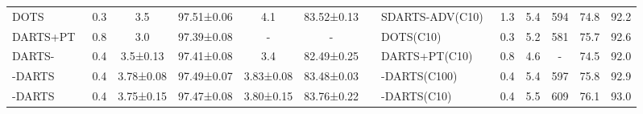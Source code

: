 \documentclass[10pt,twocolumn,letterpaper]{article}
\begin{document}
\begin{table*}[t]
\begin{center}
{\begin{tabular}{lcccccllccccc}
DOTS~\cite{dots}                    & 0.3                                                                   & 3.5          & 97.51±0.06    & 4.1           & 83.52±0.13    &  & SDARTS-ADV(C10)~\cite{sdarts}                     & 1.3                                                                   & 5.4                                                                   & 594                                                                  & 74.8                                                                 & 92.2                                                                 \\
DARTS+PT~\cite{darts+pt}                & 0.8                                                                   & 3.0          & 97.39±0.08    & -             & -             &  & DOTS(C10)~\cite{dots}                           & 0.3                                                                   & 5.2                                                                   & 581                                                                  & 75.7                                                                 & 92.6                                                                 \\
DARTS-~\cite{darts-}                  & 0.4                                                                   & 3.5±0.13     & 97.41±0.08    & 3.4           & 82.49±0.25    &  & DARTS+PT(C10)~\cite{darts+pt}                       & 0.8                                                                   & 4.6                                                                   & -                                                                    & 74.5                                                                 & 92.0                                                                 \\
-DARTS         & 0.4                                                                   & 3.78±0.08    & 97.49±0.07    & 3.83±0.08     & 83.48±0.03    &  & -DARTS(C100)                     & 0.4                                                  & 5.4                                                  & 597                                                 & 75.8                                                 & 92.9                                                 \\
-DARTS        & 0.4                                                                    & 3.75±0.15    & 97.47±0.08    & 3.80±0.15     & 83.76±0.22    &  & -DARTS(C10)                    & 0.4                                                   & 5.5                                                   & 609                                                   & 76.1                                                                     & 93.0                                                                     \\ \cline{1-6} \cline{8-13} 
\end{tabular}
}
\end{center}
\vspace{-12pt}
\end{table*}
\end{document}
